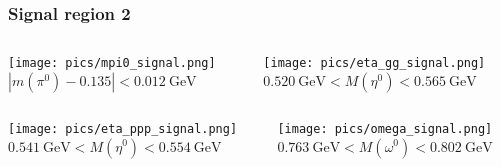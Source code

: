 \documentclass[10 pt,compress,mathserif]{beamer}
\begin{document}
\begin{frame}
 \frametitle{Signal region 2}
 \begin{small}
 \begin{columns}
  \begin{column}{0.5\textwidth}
   \begin{center}
    \texttt{[image: pics/mpi0\_signal.png]}\\
   $\left|m(\pi^0)-0.135\right|<0.012\ \text{GeV}$\\
   \end{center}
  \end{column}
  \begin{column}{0.5\textwidth}
  \begin{center}
   \texttt{[image: pics/eta\_gg\_signal.png]}\\
   $0.520\ \text{GeV}<M(\eta^0)<0.565\ \text{GeV}$\\
  \end{center}
  \end{column}
 \end{columns}
 \begin{columns}
  \begin{column}{0.5\textwidth}
  \begin{center}
   \texttt{[image: pics/eta\_ppp\_signal.png]}\\
   $0.541\ \text{GeV}<M(\eta^0)<0.554\ \text{GeV}$\\
  \end{center}
  \end{column}
  \begin{column}{0.5\textwidth}
  \begin{center}
   \texttt{[image: pics/omega\_signal.png]}\\
   $0.763\ \text{GeV}<M(\omega^0)<0.802\ \text{GeV}$\\
  \end{center}
  \end{column}
 \end{columns}
 \end{small}
\end{frame}
\end{document}
